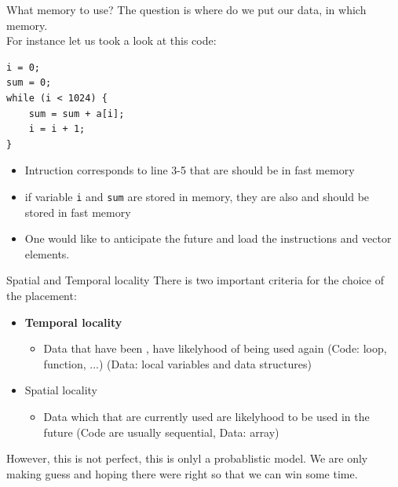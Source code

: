 \begin{parag}{What memory to use?} The question is where do we put our data, in which memory.\\
	For instance let us took a look at this code:
	\begin{lstlisting}[langage=c]
i = 0;
sum = 0;
while (i < 1024) {
	sum = sum + a[i];
	i = i + 1; 
}
	\end{lstlisting}
	
	\begin{itemize}
	    \item Intruction corresponds to line 3-5 that are should be in fast memory
	    \item if variable \texttt{i} and \texttt{sum} are stored in memory, they are also  and should be stored in fast memory
	    \item One would like to anticipate the future and load the  instructions and vector elements.
	\end{itemize}
\end{parag}
\begin{parag}{Spatial and Temporal locality}
    There is two important criteria for the choice of the placement:
	\begin{itemize}
	    \item \textbf{Temporal locality}
			\begin{itemize}
			    \item Data that have been , have likelyhood of being used again (Code: loop, function, ...) (Data: local variables and data structures)
			\end{itemize}
			\item Spatial locality
				\begin{itemize}
				    \item Data which  that are currently used are likelyhood to be used in the future (Code are usually sequential, Data: array)
				\end{itemize}
	\end{itemize}
	However, this is not perfect, this is onlyl a probablistic model. We are only making guess and hoping there were right so that we can win some time.
\end{parag}

